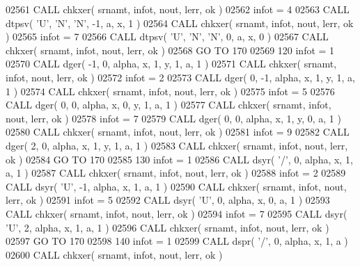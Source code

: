 \begin{DoxyCode}
02561       \textcolor{keyword}{CALL }chkxer( srnamt, infot, nout, lerr, ok )
02562       infot = 4
02563       \textcolor{keyword}{CALL }dtpsv( \textcolor{stringliteral}{'U'}, \textcolor{stringliteral}{'N'}, \textcolor{stringliteral}{'N'}, -1, a, x, 1 )
02564       \textcolor{keyword}{CALL }chkxer( srnamt, infot, nout, lerr, ok )
02565       infot = 7
02566       \textcolor{keyword}{CALL }dtpsv( \textcolor{stringliteral}{'U'}, \textcolor{stringliteral}{'N'}, \textcolor{stringliteral}{'N'}, 0, a, x, 0 )
02567       \textcolor{keyword}{CALL }chkxer( srnamt, infot, nout, lerr, ok )
02568       \textcolor{keywordflow}{GO TO} 170
02569   120 infot = 1
02570       \textcolor{keyword}{CALL }dger( -1, 0, alpha, x, 1, y, 1, a, 1 )
02571       \textcolor{keyword}{CALL }chkxer( srnamt, infot, nout, lerr, ok )
02572       infot = 2
02573       \textcolor{keyword}{CALL }dger( 0, -1, alpha, x, 1, y, 1, a, 1 )
02574       \textcolor{keyword}{CALL }chkxer( srnamt, infot, nout, lerr, ok )
02575       infot = 5
02576       \textcolor{keyword}{CALL }dger( 0, 0, alpha, x, 0, y, 1, a, 1 )
02577       \textcolor{keyword}{CALL }chkxer( srnamt, infot, nout, lerr, ok )
02578       infot = 7
02579       \textcolor{keyword}{CALL }dger( 0, 0, alpha, x, 1, y, 0, a, 1 )
02580       \textcolor{keyword}{CALL }chkxer( srnamt, infot, nout, lerr, ok )
02581       infot = 9
02582       \textcolor{keyword}{CALL }dger( 2, 0, alpha, x, 1, y, 1, a, 1 )
02583       \textcolor{keyword}{CALL }chkxer( srnamt, infot, nout, lerr, ok )
02584       \textcolor{keywordflow}{GO TO} 170
02585   130 infot = 1
02586       \textcolor{keyword}{CALL }dsyr( \textcolor{stringliteral}{'/'}, 0, alpha, x, 1, a, 1 )
02587       \textcolor{keyword}{CALL }chkxer( srnamt, infot, nout, lerr, ok )
02588       infot = 2
02589       \textcolor{keyword}{CALL }dsyr( \textcolor{stringliteral}{'U'}, -1, alpha, x, 1, a, 1 )
02590       \textcolor{keyword}{CALL }chkxer( srnamt, infot, nout, lerr, ok )
02591       infot = 5
02592       \textcolor{keyword}{CALL }dsyr( \textcolor{stringliteral}{'U'}, 0, alpha, x, 0, a, 1 )
02593       \textcolor{keyword}{CALL }chkxer( srnamt, infot, nout, lerr, ok )
02594       infot = 7
02595       \textcolor{keyword}{CALL }dsyr( \textcolor{stringliteral}{'U'}, 2, alpha, x, 1, a, 1 )
02596       \textcolor{keyword}{CALL }chkxer( srnamt, infot, nout, lerr, ok )
02597       \textcolor{keywordflow}{GO TO} 170
02598   140 infot = 1
02599       \textcolor{keyword}{CALL }dspr( \textcolor{stringliteral}{'/'}, 0, alpha, x, 1, a )
02600       \textcolor{keyword}{CALL }chkxer( srnamt, infot, nout, lerr, ok )

\end{DoxyCode}
